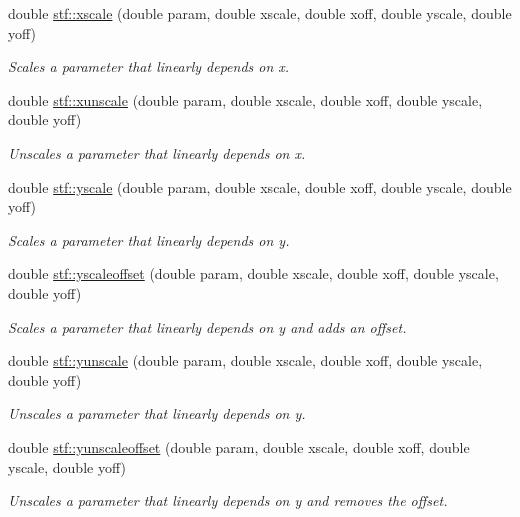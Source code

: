 \begin{DoxyCompactItemize}
double \hyperlink{group__stfgen_gabe31dea1c4b9c10627815f17c56f4549}{stf::xscale} (double param, double xscale, double xoff, double yscale, double yoff)
\begin{DoxyCompactList}\small\item\em Scales a parameter that linearly depends on x. \item\end{DoxyCompactList}\item 
double \hyperlink{group__stfgen_ga3f08b8e36843ae1e5ef9b285cc5f86b7}{stf::xunscale} (double param, double xscale, double xoff, double yscale, double yoff)
\begin{DoxyCompactList}\small\item\em Unscales a parameter that linearly depends on x. \item\end{DoxyCompactList}\item 
double \hyperlink{group__stfgen_ga00c92887edc6d459207573419ede56ef}{stf::yscale} (double param, double xscale, double xoff, double yscale, double yoff)
\begin{DoxyCompactList}\small\item\em Scales a parameter that linearly depends on y. \item\end{DoxyCompactList}\item 
double \hyperlink{group__stfgen_gae9d5e4c6d163781154d54888906e3928}{stf::yscaleoffset} (double param, double xscale, double xoff, double yscale, double yoff)
\begin{DoxyCompactList}\small\item\em Scales a parameter that linearly depends on y and adds an offset. \item\end{DoxyCompactList}\item 
double \hyperlink{group__stfgen_ga7d081bd58e0107dc245a8441e45e3929}{stf::yunscale} (double param, double xscale, double xoff, double yscale, double yoff)
\begin{DoxyCompactList}\small\item\em Unscales a parameter that linearly depends on y. \item\end{DoxyCompactList}\item 
double \hyperlink{group__stfgen_gab000f4b8bc54c11315091c912ba0c1e0}{stf::yunscaleoffset} (double param, double xscale, double xoff, double yscale, double yoff)
\begin{DoxyCompactList}\small\item\em Unscales a parameter that linearly depends on y and removes the offset. \item\end{DoxyCompactList}\item 

\end{DoxyCompactItemize}
